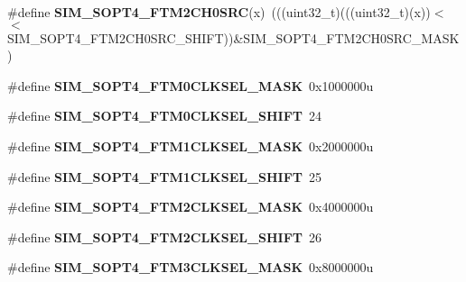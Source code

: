 \begin{DoxyCompactItemize}
\item 
\#define {\bfseries S\+I\+M\+\_\+\+S\+O\+P\+T4\+\_\+\+F\+T\+M2\+C\+H0\+S\+RC}(x)~(((uint32\+\_\+t)(((uint32\+\_\+t)(x))$<$$<$S\+I\+M\+\_\+\+S\+O\+P\+T4\+\_\+\+F\+T\+M2\+C\+H0\+S\+R\+C\+\_\+\+S\+H\+I\+FT))\&S\+I\+M\+\_\+\+S\+O\+P\+T4\+\_\+\+F\+T\+M2\+C\+H0\+S\+R\+C\+\_\+\+M\+A\+SK)\hypertarget{group__SIM__Register__Masks_ga6a8da66546e327289373ab1c101f0249}{}\label{group__SIM__Register__Masks_ga6a8da66546e327289373ab1c101f0249}

\item 
\#define {\bfseries S\+I\+M\+\_\+\+S\+O\+P\+T4\+\_\+\+F\+T\+M0\+C\+L\+K\+S\+E\+L\+\_\+\+M\+A\+SK}~0x1000000u\hypertarget{group__SIM__Register__Masks_gaac823c598ac790d9eeeeb7ddb86d1657}{}\label{group__SIM__Register__Masks_gaac823c598ac790d9eeeeb7ddb86d1657}

\item 
\#define {\bfseries S\+I\+M\+\_\+\+S\+O\+P\+T4\+\_\+\+F\+T\+M0\+C\+L\+K\+S\+E\+L\+\_\+\+S\+H\+I\+FT}~24\hypertarget{group__SIM__Register__Masks_ga77c42e9023c3ed2d759431e2c072860f}{}\label{group__SIM__Register__Masks_ga77c42e9023c3ed2d759431e2c072860f}

\item 
\#define {\bfseries S\+I\+M\+\_\+\+S\+O\+P\+T4\+\_\+\+F\+T\+M1\+C\+L\+K\+S\+E\+L\+\_\+\+M\+A\+SK}~0x2000000u\hypertarget{group__SIM__Register__Masks_ga0cd5cb92a9ea79e8227693c793ee5983}{}\label{group__SIM__Register__Masks_ga0cd5cb92a9ea79e8227693c793ee5983}

\item 
\#define {\bfseries S\+I\+M\+\_\+\+S\+O\+P\+T4\+\_\+\+F\+T\+M1\+C\+L\+K\+S\+E\+L\+\_\+\+S\+H\+I\+FT}~25\hypertarget{group__SIM__Register__Masks_ga04492b54a5b581b3bdef8568bdbabf91}{}\label{group__SIM__Register__Masks_ga04492b54a5b581b3bdef8568bdbabf91}

\item 
\#define {\bfseries S\+I\+M\+\_\+\+S\+O\+P\+T4\+\_\+\+F\+T\+M2\+C\+L\+K\+S\+E\+L\+\_\+\+M\+A\+SK}~0x4000000u\hypertarget{group__SIM__Register__Masks_ga8e9ace9af53ead470265ca2338402dae}{}\label{group__SIM__Register__Masks_ga8e9ace9af53ead470265ca2338402dae}

\item 
\#define {\bfseries S\+I\+M\+\_\+\+S\+O\+P\+T4\+\_\+\+F\+T\+M2\+C\+L\+K\+S\+E\+L\+\_\+\+S\+H\+I\+FT}~26\hypertarget{group__SIM__Register__Masks_ga4b5b8e4dc00734623d8a16db8ff0510c}{}\label{group__SIM__Register__Masks_ga4b5b8e4dc00734623d8a16db8ff0510c}

\item 
\#define {\bfseries S\+I\+M\+\_\+\+S\+O\+P\+T4\+\_\+\+F\+T\+M3\+C\+L\+K\+S\+E\+L\+\_\+\+M\+A\+SK}~0x8000000u\hypertarget{group__SIM__Register__Masks_gad4d365b5afa43ac25661ec0d06423162}{}\label{group__SIM__Register__Masks_gad4d365b5afa43ac25661ec0d06423162}


\end{DoxyCompactItemize}
